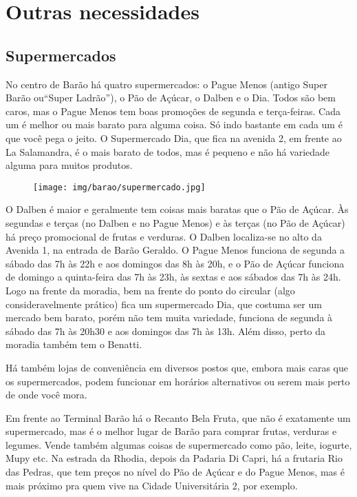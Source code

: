 
\section{Outras necessidades}
\subsection{Supermercados}

No centro de Barão há quatro supermercados: o Pague Menos (antigo Super Barão
ou``Super Ladrão''), o Pão de Açúcar, o Dalben e o Dia. Todos são bem caros,
mas o Pague Menos tem boas promoções de segunda e terça-feiras. Cada um é
melhor ou mais barato para alguma coisa. Só indo bastante em cada um é que você
pega o jeito. O Supermercado Dia, que fica na avenida 2, em frente ao La
Salamandra, é o mais barato de todos, mas é pequeno e não há variedade alguma
para muitos produtos.

\begin{figure}[h!]
    \centering
    \texttt{[image: img/barao/supermercado.jpg]}
\end{figure}

O Dalben é maior e geralmente tem coisas mais baratas que o Pão de Açúcar.
Às segundas e terças (no Dalben e no Pague Menos) e às terças (no Pão de
Açúcar) há preço promocional de frutas e verduras. O Dalben localiza-se no
alto da Avenida 1, na entrada de Barão Geraldo. O Pague Menos funciona de
segunda a sábado das 7h às 22h e aos domingos das 8h às 20h, e o Pão de
Açúcar funciona de domingo a quinta-feira das 7h às 23h, às sextas e aos
sábados das 7h às 24h. Logo na frente da moradia, bem na frente do ponto do
circular (algo consideravelmente prático) fica um supermercado Dia, que costuma
ser um mercado bem barato, porém não tem muita variedade, funciona de segunda à
sábado das 7h às 20h30 e aos domingos das 7h às 13h. Além disso, perto da
moradia também tem o Benatti.

Há também lojas de conveniência em diversos postos que, embora mais caras que
os supermercados, podem funcionar em horários alternativos ou serem mais perto
de onde você mora.

Em frente ao Terminal Barão há o Recanto Bela Fruta, que não é exatamente um
supermercado, mas é o melhor lugar de Barão para comprar frutas, verduras e
legumes. Vende também algumas coisas de supermercado como pão, leite, iogurte,
Mupy etc. Na estrada da Rhodia, depois da Padaria Di Capri, há a frutaria Rio
das Pedras, que tem preços no nível do Pão de Açúcar e do Pague Menos, mas é
mais próximo pra quem vive na Cidade Universitária 2, por exemplo.

